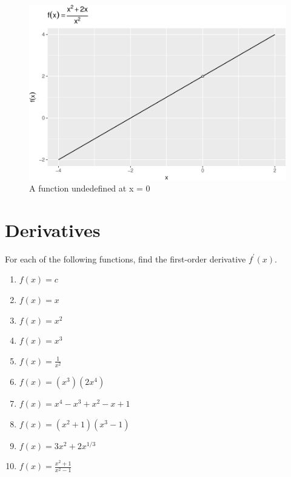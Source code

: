 \documentclass[
]{article}
\begin{document}
\begin{figure}
\centering
\includegraphics{figure-latex/fig-hole-0-1.pdf}
\caption{\label{fig:fig-hole-0}A function undedefined at x = 0}
\end{figure}

\newpage
\section{Derivatives}

\begin{exercise}
\protect\hypertarget{exr:introderivatives}{}\label{exr:introderivatives}

For each of the following functions, find the first-order derivative \(f^\prime(x)\).

\begin{enumerate}
\def\labelenumi{\arabic{enumi}.}
\tightlist
\item
  \(f(x)=c\)
\item
  \(f(x)=x\)
\item
  \(f(x)=x^2\)
\item
  \(f(x)=x^3\)
\item
  \(f(x)=\frac{1}{x^2}\)
\item
  \(f(x)=(x^3)(2x^4)\)
\item
  \(f(x) = x^4 - x^3 + x^2 - x + 1\)
\item
  \(f(x) = (x^2 + 1)(x^3 - 1)\)
\item
  \(f(x) = 3x^2 + 2x^{1/3}\)
\item
  \(f(x)=\frac{x^2+1}{x^2-1}\)
\end{enumerate}

\end{exercise}
\end{document}
